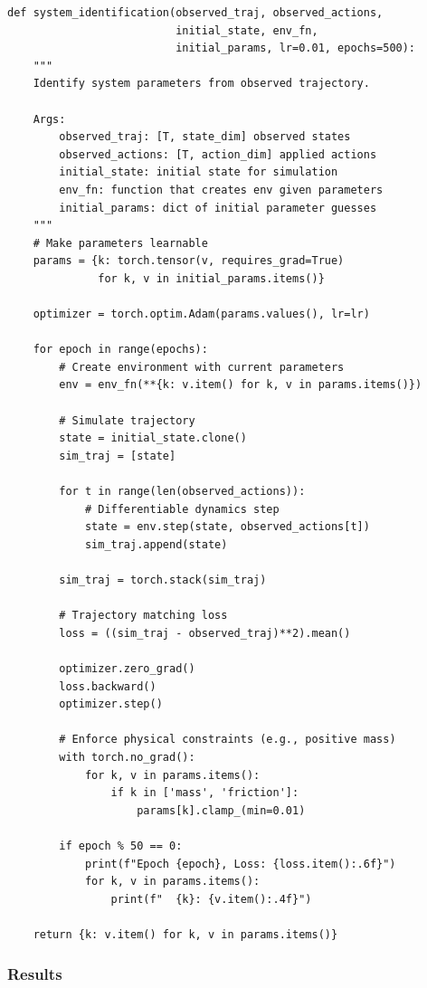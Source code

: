 \begin{verbatim}
def system_identification(observed_traj, observed_actions,
                          initial_state, env_fn,
                          initial_params, lr=0.01, epochs=500):
    """
    Identify system parameters from observed trajectory.

    Args:
        observed_traj: [T, state_dim] observed states
        observed_actions: [T, action_dim] applied actions
        initial_state: initial state for simulation
        env_fn: function that creates env given parameters
        initial_params: dict of initial parameter guesses
    """
    # Make parameters learnable
    params = {k: torch.tensor(v, requires_grad=True)
              for k, v in initial_params.items()}

    optimizer = torch.optim.Adam(params.values(), lr=lr)

    for epoch in range(epochs):
        # Create environment with current parameters
        env = env_fn(**{k: v.item() for k, v in params.items()})

        # Simulate trajectory
        state = initial_state.clone()
        sim_traj = [state]

        for t in range(len(observed_actions)):
            # Differentiable dynamics step
            state = env.step(state, observed_actions[t])
            sim_traj.append(state)

        sim_traj = torch.stack(sim_traj)

        # Trajectory matching loss
        loss = ((sim_traj - observed_traj)**2).mean()

        optimizer.zero_grad()
        loss.backward()
        optimizer.step()

        # Enforce physical constraints (e.g., positive mass)
        with torch.no_grad():
            for k, v in params.items():
                if k in ['mass', 'friction']:
                    params[k].clamp_(min=0.01)

        if epoch % 50 == 0:
            print(f"Epoch {epoch}, Loss: {loss.item():.6f}")
            for k, v in params.items():
                print(f"  {k}: {v.item():.4f}")

    return {k: v.item() for k, v in params.items()}
\end{verbatim}

\subsubsection{Results}

